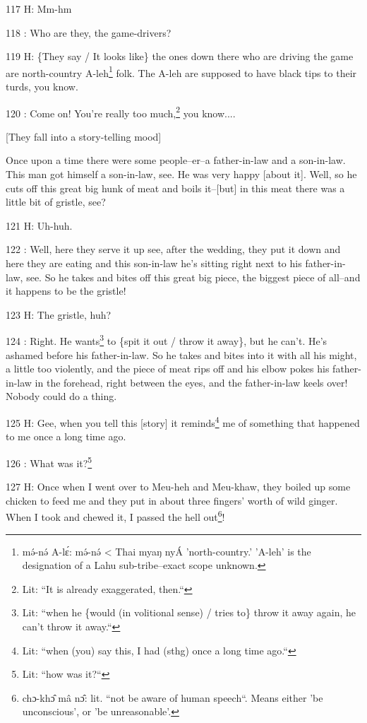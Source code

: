 117 H: Mm-hm

118  : Who are they, the game-drivers?

119 H: \{They say / It looks like\} the ones down there who are driving the game
are north-country A-leh\footnote{mə́-nə́ A-lɛ́: mə́-nə́ < Thai myaŋ nyÁ 'north-country.' 'A-leh' is the designation of a Lahu sub-tribe--exact scope unknown.} folk. The A-leh are supposed to have black tips to
their turds, you know.

120  : Come on! You're really too much,\footnote{Lit: ``It is already exaggerated, then.``} you know....

[They fall into a story-telling mood]

Once upon a time there were some people--er--a father-in-law and a son-in-law.
This man got himself a son-in-law, see. He was very happy [about it]. Well, so
he cuts off this great big hunk of meat and boils it--[but] in this meat there
was a little bit of gristle, see?

121 H: Uh-huh.

122  : Well, here they serve it up see, after the wedding, they put it down and
here they are eating and this son-in-law he's sitting right next to his father-in-law,
see. So he takes and bites off this great big piece, the biggest piece of all--and
it happens to be the gristle!

123 H: The gristle, huh?

124  : Right. He wants\footnote{Lit: ``when he \{would (in volitional sense) / tries to\} throw it away again, he can't throw it away.``} to \{spit it out / throw it away\}, but he can't. He's
ashamed before his father-in-law. So he takes and bites into it with all his might,
a little too violently, and the piece of meat rips off and his elbow pokes his
father-in-law in the forehead, right between the eyes, and the father-in-law keels
over! Nobody could do a thing.

125 H: Gee, when you tell this [story] it reminds\footnote{Lit: ``when (you) say this, I had (sthg) once a long time ago.``} me of something that happened
to me once a long time ago.

126  : What was it?\footnote{Lit: ``how was it?``}

127 H: Once when I went over to Meu-heh and Meu-khaw, they boiled up some chicken
to feed me and they put in about three fingers' worth of wild ginger. When I took
and chewed it, I passed the hell out\footnote{chɔ-khɔ̂ mâ nɔ̂: lit. ``not be aware of human speech``. Means either 'be unconscious', or 'be unreasonable'.}!

